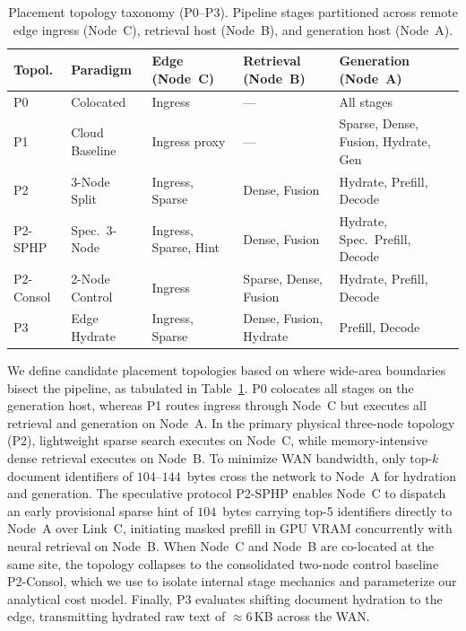 \documentclass[conference,a4paper]{IEEEtran}
\begin{document}
\begin{table}[t]
\centering
\caption{Placement topology taxonomy (P0--P3). Pipeline stages partitioned across remote edge ingress (Node~C), retrieval host (Node~B), and generation host (Node~A).}
\label{tab:topologies}
\setlength{\tabcolsep}{1.5pt}
\fontsize{6.0pt}{7.2pt}\selectfont
\begin{tabularx}{\columnwidth}{@{}l l >{\raggedright\arraybackslash}X >{\raggedright\arraybackslash}X >{\raggedright\arraybackslash}X@{}}
\toprule
Topol. & Paradigm & Edge (Node~C) & Retrieval (Node~B) & Generation (Node~A) \\
\midrule
P0 & Colocated & Ingress & --- & All stages \\
P1 & Cloud Baseline & Ingress proxy & --- & Sparse, Dense, Fusion, Hydrate, Gen \\
P2 & 3-Node Split & Ingress, Sparse & Dense, Fusion & Hydrate, Prefill, Decode \\
P2-SPHP & Spec.~3-Node & Ingress, Sparse, Hint & Dense, Fusion & Hydrate, Spec.~Prefill, Decode \\
P2-Consol & 2-Node Control & Ingress & Sparse, Dense, Fusion & Hydrate, Prefill, Decode \\
P3 & Edge Hydrate & Ingress, Sparse & Dense, Fusion, Hydrate & Prefill, Decode \\
\bottomrule
\end{tabularx}
\vspace{-2mm}
\end{table}

We define candidate placement topologies based on where wide-area boundaries bisect the pipeline, as tabulated in Table~\ref{tab:topologies}. P0 colocates all stages on the generation host, whereas P1 routes ingress through Node~C but executes all retrieval and generation on Node~A. In the primary physical three-node topology (P2), lightweight sparse search executes on Node~C, while memory-intensive dense retrieval executes on Node~B. To minimize WAN bandwidth, only top-$k$ document identifiers of $104$--$144$~bytes cross the network to Node~A for hydration and generation. The speculative protocol P2-SPHP enables Node~C to dispatch an early provisional sparse hint of $104$~bytes carrying top-5 identifiers directly to Node~A over Link~C, initiating masked prefill in GPU VRAM concurrently with neural retrieval on Node~B. When Node~C and Node~B are co-located at the same site, the topology collapses to the consolidated two-node control baseline P2-Consol, which we use to isolate internal stage mechanics and parameterize our analytical cost model. Finally, P3 evaluates shifting document hydration to the edge, transmitting hydrated raw text of $\approx$6\,KB across the WAN.
\end{document}
